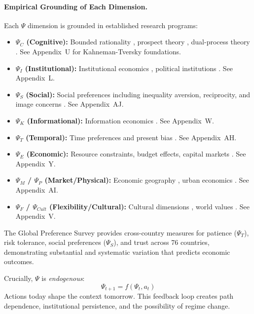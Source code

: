 \paragraph{Empirical Grounding of Each Dimension.}
Each $\Psi$ dimension is grounded in established research programs:
\begin{itemize}
  \item \textbf{$\Psi_C$ (Cognitive):} Bounded rationality \citep{simon1962},
        prospect theory \citep{kahnemantversky1979}, dual-process theory
        \citep{kahneman2011}. See Appendix~U for Kahneman-Tversky foundations.
  \item \textbf{$\Psi_I$ (Institutional):} Institutional economics \citep{north1990},
        political institutions \citep{acemoglurobinson2012}. See Appendix~L.
  \item \textbf{$\Psi_S$ (Social):} Social preferences including inequality aversion,
        reciprocity, and image concerns \citep{fehrcharness2024}. See Appendix~AJ.
  \item \textbf{$\Psi_K$ (Informational):} Information economics
        \citep{akerlof1970,spence1973,stiglitz2000}. See Appendix~W.
  \item \textbf{$\Psi_T$ (Temporal):} Time preferences and present bias
        \citep{laibson1997,frederick2002time}. See Appendix~AH.
  \item \textbf{$\Psi_E$ (Economic):} Resource constraints, budget effects,
        capital markets \citep{fama1970}. See Appendix~Y.
  \item \textbf{$\Psi_M$ / $\Psi_P$ (Market/Physical):} Economic geography \citep{krugman1991},
        urban economics \citep{glaeser2008}. See Appendix~AI.
  \item \textbf{$\Psi_F$ / $\Psi_{Cult}$ (Flexibility/Cultural):} Cultural dimensions 
        \citep{hofstede1980,house2004}, world values \citep{inglehart2014}. See Appendix~V.
\end{itemize}

The Global Preference Survey \citep{falk2018} provides cross-country measures
for patience ($\Psi_T$), risk tolerance, social preferences ($\Psi_S$), and
trust across 76 countries, demonstrating substantial and systematic variation
that predicts economic outcomes.


Crucially, $\Psi$ is \emph{endogenous}:
\begin{equation}
  \Psi_{t+1} = f(\Psi_t, a_t)
\end{equation}
Actions today shape the context tomorrow. This feedback loop creates path dependence, institutional persistence, and the possibility of regime change.

